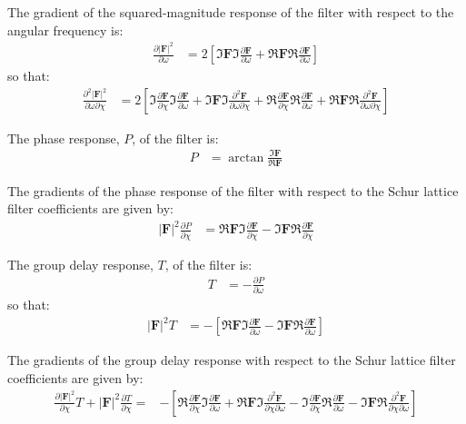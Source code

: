\documentclass[a4paper,twoside,10pt,english]{article}
\begin{document}
The gradient of the squared-magnitude response of the filter with respect to 
the angular frequency is:
\begin{align*}
\frac{\partial\left|\mathbf{F}\right|^{2}}{\partial\omega}
&= 2\left[\Im \mathbf{F}\Im\frac{\partial{}\mathbf{F}}{\partial\omega}+
          \Re \mathbf{F}\Re\frac{\partial{}\mathbf{F}}{\partial\omega}\right]
\end{align*}
so that:
\begin{align*}
  \frac{\partial^{2}  \left|\mathbf{F}\right|^{2}}
  {\partial\omega\partial\chi}
  &= 2\left[ \Im\frac{\partial{}\mathbf{F}}{\partial\chi}
             \Im\frac{\partial{}\mathbf{F}}{\partial\omega}+
    \Im \mathbf{F}\Im\frac{\partial^{2}\mathbf{F}}{\partial\omega\partial\chi}+
    \Re\frac{\partial{}\mathbf{F}}{\partial\chi}
    \Re\frac{\partial{}\mathbf{F}}{\partial\omega}+
    \Re \mathbf{F}\Re\frac{\partial^{2}\mathbf{F}}{\partial\omega\partial\chi}
  \right]
\end{align*}

The phase response, $P$, of the filter is:
\begin{align*}%
P&=\arctan\frac{\Im \mathbf{F}}{\Re \mathbf{F}}
\end{align*}

The gradients of the phase response of the filter with respect to 
the Schur lattice filter coefficients are given by:
\begin{align*}
\left|\mathbf{F}\right|^{2}\frac{\partial{}P}{\partial\chi}&=
\Re \mathbf{F}\Im\frac{\partial{}\mathbf{F}}{\partial\chi}-
\Im \mathbf{F}\Re\frac{\partial{}\mathbf{F}}{\partial\chi}
\end{align*}

The group delay response, $T$, of the filter is:
\begin{align*}
T &= -\frac{\partial P}{\partial\omega}
\end{align*}
so that:
\begin{align*}
\left|\mathbf{F}\right|^{2}T &= -\left[\Re \mathbf{F}\Im\frac{\partial \mathbf{F}}{\partial\omega} -
                              \Im \mathbf{F}\Re\frac{\partial \mathbf{F}}{\partial\omega}\right]
\end{align*}

The gradients of the group delay response with respect to the Schur lattice
filter coefficients are given by:
\begin{align*}
  \frac{\partial\left|\mathbf{F}\right|^{2}}{\partial\chi}T+
  \left|\mathbf{F}\right|^{2}\frac{\partial{}T}{\partial\chi} = 
&-\left[\Re\frac{\partial{}\mathbf{F}}{\partial\chi}
\Im\frac{\partial{}\mathbf{F}}{\partial\omega} +
\Re \mathbf{F} \Im\frac{\partial^{2}\mathbf{F}}{\partial\chi\partial\omega} -
  \Im\frac{\partial{}\mathbf{F}}{\partial\chi}
  \Re\frac{\partial{}\mathbf{F}}{\partial\omega} -
  \Im \mathbf{F}\Re\frac{\partial^{2}\mathbf{F}}
                        {\partial\chi\partial\omega}\right]
\end{align*}
\end{document}
